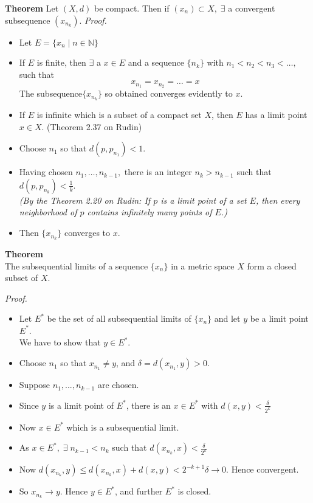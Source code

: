 \documentclass[12pt]{article}
\begin{document}
{\bf Theorem} Let $(X,d)$ be compact. Then if $(x_n)\subset X,\;\exists$ a convergent subsequence $(x_{n_k}).$
{\sl Proof.}
\begin{itemize}
    \item Let $E=\{x_n\;|\;n\in\mathbb{N}\}$
    \item If $E$ is finite, then $\exists$ a $x\in E$ and a sequence $\{n_k\}$ with $n_1<n_2<n_3<\ldots,$ such that $$x_{n_1}=x_{n_2}=\ldots = x$$
    The subsequence$\{x_{n_k}\}$ so obtained converges evidently to $x$.\\
    
    \item If $E$ is infinite which is a subset of a compact set $X$, then $E$ has a limit point $x\in X$. (Theorem 2.37 on Rudin)
    \item Choose $n_1$ so that $d(p,p_{n_1})<1$. 
    \item Having chosen $n_1,\ldots,n_{k-1},$ there is an integer $n_k>n_{k-1}$ such that $d(p,p_{n_k})< \frac{1}{k}.$\\ 
    {\sl (By the Theorem 2.20 on Rudin: 
    If $p$ is a limit point of a set $E$, then every neighborhood of $p$ contains infinitely many points of $E$.)}
    \item Then $\{x_{n_k}\}$ converges to $x$.
\end{itemize}

\newpage
{\bf Theorem}\\The subsequential limits of a sequence $\{x_n\}$ in a metric space $X$ form a closed subset of $X$.


{\sl Proof.}
\begin{itemize}
    \item Let $E^*$ be the set of all subsequential limits of $\{x_n\}$ and let $y$ be a limit point $E^*$.\\ We have to show that $y\in E^*.$
    \item Choose $n_1$ so that $x_{n_1}\neq y$, and $\delta = d(x_{n_1},y)>0.$
    \item Suppose $n_1,...,n_{k-1}$ are chosen.
    \item Since $y$ is a limit point of $E^*$, there is an $x\in E^*$ with $d(x,y)<\frac{\delta}{2^k}$
    \item Now $x\in E^*$ which is a subsequential limit.
    \item As $x\in E^*,\; \exists\; n_{k-1}<n_k$ such that $d(x_{n_k},x)<\frac{\delta}{2^k}$
    \item Now $d(x_{n_k}, y)\le d(x_{n_k},x)+d(x,y)<2^{-k+1}\delta \to 0$. Hence convergent.
    \item So $x_{n_k}\to y.$ Hence $y\in E^*$, and further $E^*$ is closed. 
\end{itemize}
\end{document}
